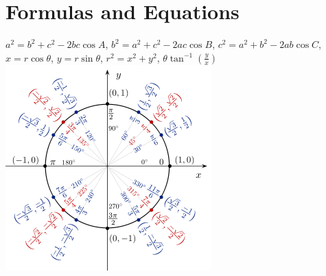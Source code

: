 \documentclass[addpoints]{exam}
\begin{document}
\section*{Formulas and Equations}
$a^2 = b^2 + c^2 -2bc \cos A$, $b^2 = a^2 + c^2 -2ac \cos B$, $c^2 = a^2 + b^2 -2ab \cos C$, $x = r\cos\theta$, $y = r\sin\theta$, $r^2 = x^2 + y^2$, $\theta \tan^{-1} (\frac{y}{x})$ \newline
\includegraphics[scale = 0.9]{unitcircle.png}
\end{document}
